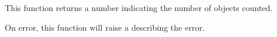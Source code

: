 This function returns a number indicating the number of objects counted.

On error, this function will raise a  describing
the error.
